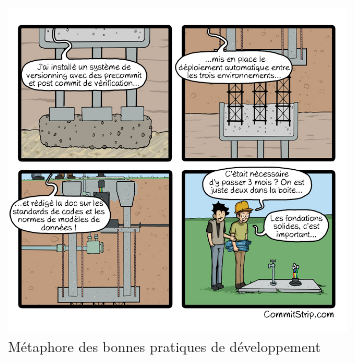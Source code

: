 \begin{figure}[h!]
\centering
\includegraphics[width=0.8\textwidth]{assets/foundation.jpg}
\caption{Métaphore des bonnes pratiques de développement}
\label{fig:my_label}
\end{figure}